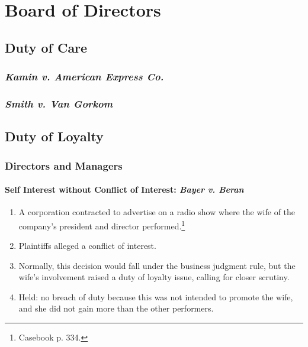 \section{Board of Directors} %

\subsection{Duty of Care}

\subsubsection{\emph{Kamin v. American Express Co.}}


\subsubsection{\emph{Smith v. Van Gorkom}}


\newpage %

\subsection{Duty of Loyalty}

\subsubsection{Directors and Managers}

\paragraph{Self Interest without Conflict of Interest: \emph{Bayer v. Beran}}

\begin{enumerate}
    \item A corporation contracted to advertise on a radio show where the wife 
    of the company's president and director performed.\footnote{Casebook p. 
    334.}
    \item Plaintiffs alleged a conflict of interest.
    \item Normally, this decision would fall under the business judgment rule, 
    but the wife's involvement raised a duty of loyalty issue, calling for 
    closer scrutiny.
    \item Held: no breach of duty because this was not intended to promote the 
    wife, and she did not gain more than the other performers. 
\end{enumerate}

